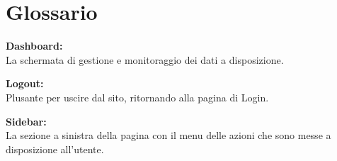 \section{Glossario}
\textbf{Dashboard:}\\La schermata di gestione e monitoraggio dei dati a disposizione.

\textbf{Logout:}\\Plusante per uscire dal sito, ritornando alla pagina di Login. 

\textbf{Sidebar:}\\ La sezione a sinistra della pagina con il menu delle azioni che sono messe a disposizione all'utente.